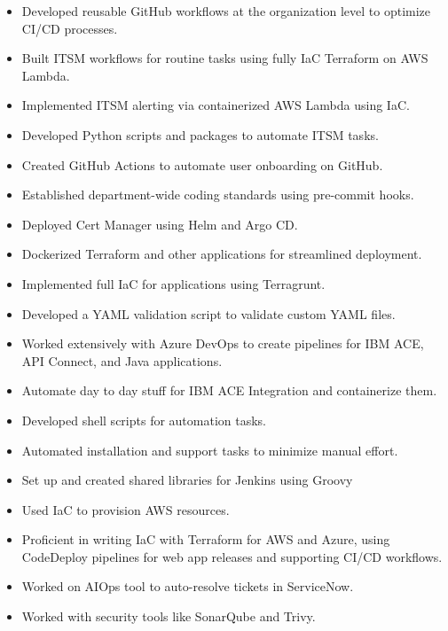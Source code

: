 \documentclass[10pt,a4paper,ragged2e,withhyper]{altacv}
\begin{document}
\begin{paracol}{2}

\begin{itemize}
\item Developed reusable GitHub workflows at the organization level to optimize CI/CD processes.
\item Built ITSM workflows for routine tasks using fully IaC Terraform on AWS Lambda.
\item Implemented ITSM alerting via containerized AWS Lambda using IaC.
\item Developed Python scripts and packages to automate ITSM tasks.
\item Created GitHub Actions to automate user onboarding on GitHub.
\item Established department-wide coding standards using pre-commit hooks.
\item Deployed Cert Manager using Helm and Argo CD.
\item Dockerized Terraform and other applications for streamlined deployment.
\item Implemented full IaC for applications using Terragrunt.
\item Developed a YAML validation script to validate custom YAML files.
\end{itemize}

\divider

\begin{itemize}
\item Worked extensively with Azure DevOps to create pipelines for IBM ACE, API Connect, and Java applications. 
\item Automate day to day stuff for IBM ACE Integration and containerize them.
\item Developed shell scripts for automation tasks.
\item Automated installation and support tasks to minimize manual effort.
\end{itemize}

\divider

\begin{itemize}
\item Set up and created shared libraries for Jenkins using Groovy
\item Used IaC to provision AWS resources.
\item Proficient in writing IaC with Terraform for AWS and Azure, using CodeDeploy pipelines for web app releases and supporting CI/CD workflows.
\item Worked on AIOps tool to auto-resolve tickets in ServiceNow.
\item Worked with security tools like SonarQube and Trivy.
\end{itemize}


\end{paracol}
\end{document}
